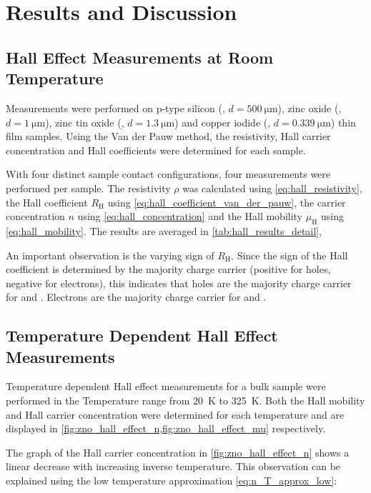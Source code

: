 \section{Results and Discussion}
\subsection{Hall Effect Measurements at Room Temperature}
Measurements were performed on p-type silicon (, $d=\qty{500}{\micro\meter}$), 
zinc oxide (, $d=\qty{1}{\micro\meter}$), zinc tin oxide (, 
$d=\qty{1.3}{\micro\meter}$) and copper iodide (, $d=\qty{0.339}{\micro\meter}$) 
thin film samples.
Using the Van der Pauw method, the resistivity, Hall carrier concentration and Hall 
coefficients were determined for each sample.

With four distinct sample contact configurations, four measurements were performed 
per sample. 
The resistivity $\rho$ was calculated using \cref{eq:hall_resistivity}, 
the Hall coefficient $R_{\mathrm{H}}$ using \cref{eq:hall_coefficient_van_der_pauw},
the carrier concentration $n$ using \cref{eq:hall_concentration} 
and the Hall mobility $\mu_{\mathrm{H}}$ using \cref{eq:hall_mobility}.
The results are averaged in \cref{tab:hall_results_detail}, 

An important observation is the varying sign of $R_{\mathrm{H}}$. 
Since the sign of the Hall coefficient is determined by the majority charge carrier
(positive for holes, negative for electrons), this indicates that holes are the majority
charge carrier for  and . 
Electrons are the majority charge carrier for  and . 

\subsection{Temperature Dependent Hall Effect Measurements}
Temperature dependent Hall effect measurements for a bulk  sample 
were performed in the Temperature range from \qty{20}{\kelvin} to \qty{325}{\kelvin}.
Both the Hall mobility and Hall carrier concentration were determined for each 
temperature and are displayed in 
\cref{fig:zno_hall_effect_n,fig:zno_hall_effect_mu} respectively.

The graph of the Hall carrier concentration in \cref{fig:zno_hall_effect_n} shows a 
linear decrease with increasing inverse temperature. 
This observation can be explained using the low temperature approximation 
\cref{eq:n_T_approx_low}:

